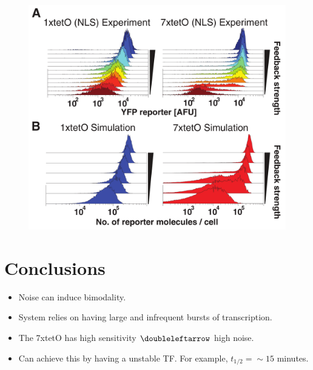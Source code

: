 \documentclass{beamer}
\begin{document}
 \begin{frame}
    \begin{figure}[ht!]
        \centering
        \includegraphics[width=.8\textwidth]{Tofig8.png}
        \label{fig:fig8to}
    \end{figure}
\end{frame}

\section{Conclusions}
\begin{frame}
    \begin{itemize}
        \item Noise can induce bimodality.
        \item System relies on having large and infrequent bursts of transcription.
        \item The 7xtetO has high sensitivity $\doubleleftarrow$ high noise.
        \item Can achieve this by having a unstable TF. For example, $t_{1/2} = \sim 15$ minutes.
    \end{itemize}
\end{frame}
\end{document}
